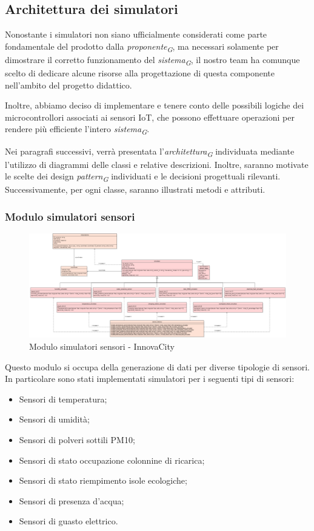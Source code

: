 \subsection{Architettura dei simulatori} \label{sec:architettura_simulatori}
Nonostante i simulatori non siano ufficialmente considerati come parte fondamentale del prodotto dalla \textit{proponente}\textsubscript{\textit{G}}, ma necessari solamente per dimostrare il corretto funzionamento del \textit{sistema}\textsubscript{\textit{G}}, il nostro team ha comunque scelto di dedicare alcune risorse alla progettazione di questa componente nell'ambito del progetto didattico.

Inoltre, abbiamo deciso di implementare e tenere conto delle possibili logiche dei microcontrollori associati ai sensori IoT, che possono effettuare operazioni per rendere più efficiente l'intero \textit{sistema}\textsubscript{\textit{G}}.

Nei paragrafi successivi, verrà presentata l'\textit{architettura}\textsubscript{\textit{G}} individuata mediante l'utilizzo di diagrammi delle classi e relative descrizioni. Inoltre, saranno motivate le scelte dei design \textit{pattern}\textsubscript{\textit{G}} individuati e le decisioni progettuali rilevanti. Successivamente, per ogni classe, saranno illustrati metodi e attributi.

\subsubsection{Modulo simulatori sensori}
\begin{figure}[H]
    \centering
    \includegraphics[width=1.1\textwidth]{../Images/SpecificaTecnica/simulatoriSensori.PNG}
    \caption{Modulo simulatori sensori - InnovaCity}
    \label{fig: Modulo_simulatori_sensori}
\end{figure}
Questo modulo si occupa della generazione di dati per diverse tipologie di sensori.
In particolare sono stati implementati simulatori per i seguenti tipi di sensori:
\begin{itemize}
    \item Sensori di temperatura;
    \item Sensori di umidità;
    \item Sensori di polveri sottili PM10;
    \item Sensori di stato occupazione colonnine di ricarica;
    \item Sensori di stato riempimento isole ecologiche;
    \item Sensori di presenza d'acqua;
    \item Sensori di guasto elettrico.
\end{itemize}
